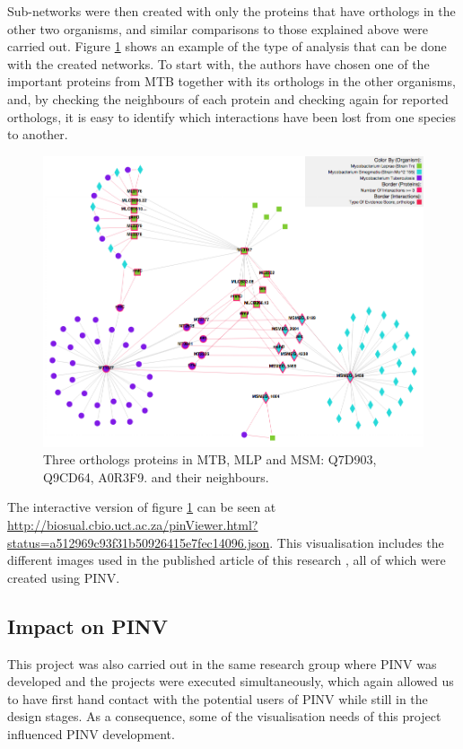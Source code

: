 Sub-networks were then created with only the proteins that have orthologs in the other two organisms, and similar comparisons to those explained above were carried out. Figure \ref{fig:pinv_orthologs} shows an example of the type of analysis that can be done with the created networks. To start with, the authors have chosen one of the important proteins from MTB together with its orthologs in the other organisms, and, by checking the neighbours of each protein and checking again for reported orthologs, it is easy to identify which interactions have been lost from one species to another.

\begin{figure}
\centering
\includegraphics[width=\textwidth]{figures/pinv_orthologs.png}
\caption[Three ortholog proteins in MTB, MLP and MSM]{Three orthologs proteins in MTB, MLP and MSM: Q7D903, Q9CD64, A0R3F9. and their neighbours.
\label{fig:pinv_orthologs}}
\end{figure}

The interactive version of figure \ref{fig:pinv_orthologs} can be seen at \url{http://biosual.cbio.uct.ac.za/pinViewer.html?status=a512969c93f31b50926415e7fec14096.json}. This visualisation includes the different images used in the published article of this research \cite{AKI2013}, all of which were created using PINV.

\subsection{Impact on PINV}
This project was also carried out in the same research group where PINV was developed and the projects were executed simultaneously, which again allowed us to have first hand contact with the potential users of PINV while still in the design stages. As a consequence, some of the visualisation needs of this project influenced PINV development.

